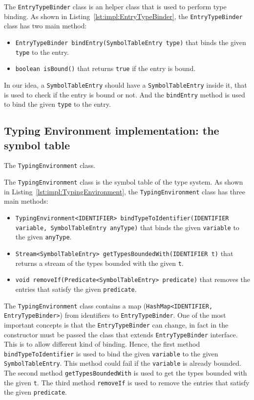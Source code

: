 The \texttt{EntryTypeBinder} class is an helper class that is used to perform type binding. As shown in Listing~\ref{lst:impl:EntryTypeBinder}, the \texttt{EntryTypeBinder} class has two main method:
\begin{itemize}
    \item \texttt{EntryTypeBinder bindEntry(SymbolTableEntry type)} that binds the given \texttt{type} to the entry.
    \item \texttt{boolean isBound()} that returns \texttt{true} if the entry is bound.
\end{itemize}

In our idea, a \texttt{SymbolTableEntry} should have a \texttt{SymbolTableEntry} inside it, that is used to check if the entry is bound or not. And the \texttt{bindEntry} method is used to bind the given \texttt{type} to the entry.

\subsection{Typing Environment implementation: the symbol table}\label{subsec:impl:TypingEnvironment}

\begin{Listing}[tb]
    \centering
    \caption{The \texttt{TypingEnvironment} class.}
    \label{lst:impl:TypingEnvironment}
\end{Listing}

The \texttt{TypingEnvironment} class is the symbol table of the type system. As shown in Listing~\ref{lst:impl:TypingEnvironment}, the \texttt{TypingEnvironment} class has three main methods:

\begin{itemize}
    \item \texttt{TypingEnvironment<IDENTIFIER> bindTypeToIdentifier(IDENTIFIER variable, SymbolTableEntry anyType)} that binds the given \texttt{variable} to the given \texttt{anyType}.
    \item \texttt{Stream<SymbolTableEntry> getTypesBoundedWith(IDENTIFIER t)} that returns a stream of the types bounded with the given \texttt{t}.
    \item \texttt{void removeIf(Predicate<SymbolTableEntry> predicate)} that removes the entries that satisfy the given \texttt{predicate}.
\end{itemize}

The \texttt{TypingEnvironment} class contains a map (\texttt{HashMap<IDENTIFIER, EntryTypeBinder>}) from identifiers to \texttt{EntryTypeBinder}. One of the most important concepts is that the \texttt{EntryTypeBinder} can change, in fact in the constructor must be passed the class that extends \texttt{EntryTypeBinder} interface. This is to allow different kind of binding.
Hence, the first method \texttt{bindTypeToIdentifier} is used to bind the given \texttt{variable} to the given \texttt{SymbolTableEntry}. This method could fail if the \texttt{variable} is already bounded. The second method \texttt{getTypesBoundedWith} is used to get the types bounded with the given \texttt{t}. The third method \texttt{removeIf} is used to remove the entries that satisfy the given \texttt{predicate}.

